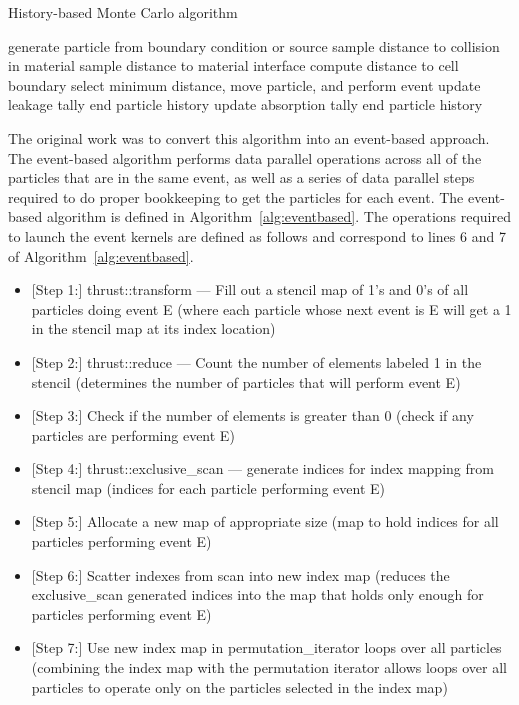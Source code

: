 \begin{algorithm}
\DontPrintSemicolon
\caption{History-based Monte Carlo algorithm}
\label{alg:history-based}
{ 
    generate particle from boundary condition or source\;
    {
       sample distance to collision in material\;
       sample distance to material interface\;
       compute distance to cell boundary\;
       select minimum distance, move particle, and perform event\;
       {
          update leakage tally\;
          end particle history\;
       }
       {
          update absorption tally\;
          end particle history\;
       }
    }
}
\end{algorithm}
%

%
The original work was to convert this algorithm into an event-based approach.
%
The event-based algorithm performs data parallel operations across all of the particles that are in the same event, as well as a series of data parallel steps required to do proper bookkeeping to get the particles for each event.
%
The event-based algorithm is defined in Algorithm~\ref{alg:eventbased}.
%
The operations required to launch the event kernels are defined as follows and correspond to lines 6 and 7 of Algorithm~\ref{alg:eventbased}.
%
\begin{itemize}
\item{[Step 1:]} thrust::transform --- Fill out a stencil map of 1's and 0's of all particles doing event E (where each particle whose next event is E will get a 1 in the stencil map at its index location)
\item{[Step 2:]} thrust::reduce --- Count the number of elements labeled 1 in the stencil (determines the number of particles that will perform event E)
\item{[Step 3:]} Check if the number of elements is greater than 0 (check if any particles are performing event E)
\item{[Step 4:]} thrust::exclusive\_scan --- generate indices for index mapping from stencil map (indices for each particle performing event E)
\item{[Step 5:]} Allocate a new map of appropriate size (map to hold indices for all particles performing event E)
\item{[Step 6:]} Scatter indexes from scan into new index map (reduces the exclusive\_scan generated indices into the map that holds only enough for particles performing event E)
\item{[Step 7:]} Use new index map in permutation\_iterator loops over all particles (combining the index map with the permutation iterator allows loops over all particles to operate only on the particles selected in the index map)
\end{itemize}
~\cite{alpsmc1}
%

